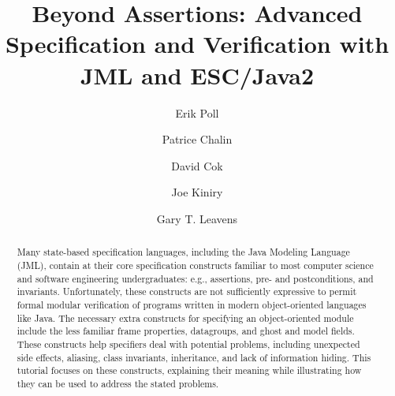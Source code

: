 \documentclass{llncs}
\begin{document}
\title{Beyond Assertions: 
       Advanced Specification and Verification with JML and ESC/Java2}

\author{Erik Poll
        \and Patrice Chalin
        \and David Cok
        \and Joe Kiniry
        \and Gary T. Leavens 
       }



%
\newcommand{\GMARGIN}[1]{\marginpar{\textcolor{blue}{\sf\scriptsize #1}}}
\newcommand{\MARGIN}[1]{\marginpar{\sf\scriptsize #1}}
\newcommand{\COMMENT}[1]{{\sf\scriptsize  #1}}

\newcommand{\figref}[1]{\figurename~\ref{#1}}
\newcommand{\secref}[1]{Section~\ref{#1}}

\newcommand{\extracite}[1]{} %

\maketitle

\begin{abstract}
Many state-based specification languages, including the Java Modeling Language
(JML), contain at their core specification constructs familiar to most
computer science and software engineering undergraduates: e.g., assertions,
pre- and postconditions, and invariants.  Unfortunately, these constructs are
not sufficiently expressive to permit formal modular verification of programs
written in modern object-oriented languages like Java. The necessary extra
constructs for specifying an object-oriented module include the less familiar
frame properties, datagroups, and ghost and model fields.  These constructs
help specifiers deal with potential problems, including unexpected side
effects, aliasing, class invariants, inheritance, and lack of information
hiding.
%
This tutorial focuses on these constructs, explaining their meaning while
illustrating how they can be used to address the stated problems.
\end{abstract}
\end{document}
